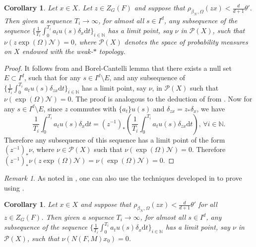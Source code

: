 \documentclass[12pt,reqno]{amsart}
\numberwithin{equation}{section}
\theoremstyle{plain}
\newtheorem{cor}[thm]{Corollary}
\theoremstyle{definition}
\theoremstyle{remark}
\newtheorem{remark}{Remark}[section]
\newcommand\cN{\mathcal{N}}
\newcommand\cP{\mathcal{P}}
\newcommand{\N}{\mathbb{N}}
\newcommand{\de}{\mathrm{d}}
\newcommand{\bN}{\beta_\cN}
\begin{document}
    \begin{cor} \label{cor:non focusing}
         Let $x\in X$. Let $z\in Z_G(F)$ and suppose that $\rho_{\bN,\Omega}(zx)<\frac{d}{d+1}\theta'$. Then given a sequence $T_i\to\infty$, for almost all $s\in I^d$, any subsequence of the sequence $\bigl\{\frac{1}{T_i}\int_0^{T_i} a_tu(s)\delta_{x}\de t\bigr\}_{i\in\N}$ has a limit point, say $\nu$ in $\cP(X)$, such that $\nu(z\exp(\Omega)\cN)=0$, where $\cP(X)$ denotes the space of probability measures on $X$ endowed with the weak-$\ast$ topology.   
    \end{cor}
    
    \begin{proof}
        It follows from  and Borel-Cantelli lemma that
        there exists a null set $E\subset I^d$,
        such that for any $s\in I^d\setminus E$, and any subsequence of $\bigl\{\frac{1}{T_i}\int_0^{T_i} a_tu(s)\delta_{zx}\de t\bigr\}_{i\in\N}$ has a limit point, say $\nu$, in $\cP(X)$ such that $\nu(\exp(\Omega)\cN)=0$. The proof is analogous to the deduction of  from .  
        Now for any $s\in I^d\setminus E$,
        since $z$ commutes with $\{a_t\}u(s)$ and $\delta_{zx}=z_\ast\delta_x$, we have
        \[
        \frac{1}{T_i}\int_0^{T_i} a_tu(s)\delta_{x}\de t=(z^{-1})_\ast\left(\frac{1}{T_i}\int_0^{T_i} a_tu(s)\delta_{zx}\de t\right), \,\forall i\in\N.
        \]
        Therefore any subsequence of this sequence has a limit point of the form $(z^{-1})_\ast\nu$, where $\nu\in \cP(X)$ such that $\nu(\exp(\Omega)\cN)=0$. Therefore $(z^{-1})_\ast\nu(z\exp(\Omega)\cN)=\nu(\exp(\Omega)\cN)=0$.
    \end{proof}

    \begin{remark}
        As noted in , one can also use the techniques developed in \cite{KKLM17,Kha20} to prove  using .
    \end{remark}

\begin{cor}
    \label{cor:general} 
    Let $x\in X$ and suppose that $\rho_{\bN,\Omega}(zx)<\frac{d}{d+1}\theta'$ for all $z\in Z_G(F)$. Then given a sequence $T_i\to\infty$, for almost all $s\in I^d$, any subsequence of the sequence $\bigl\{\frac{1}{T_i}\int_0^{T_i} a_tu(s)\delta_{x}\de t\bigr\}_{i\in\N}$ has a limit point, say $\nu$ in $\cP(X)$, such that $\nu(N(F,M)x_0)=0$. 
\end{cor}
\end{document}
